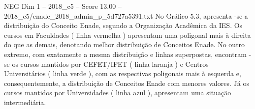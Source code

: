 \begin{textsample}{NEG Dim 1 – 2018\_c5 – Score 13.00 – 2018\_c5/enade\_2018\_admin\_p\_5d727a5391.txt}
No Gráfico 5.3, apresenta -se a distribuição do Conceito Enade, segundo a Organização Acadêmica da IES.
Os cursos em Faculdades ( linha vermelha ) apresentam uma poligonal mais à direita do que as demais, denotando melhor distribuição de Conceitos Enade.
No outro extremo, com exatamente a mesma distribuição e linhas superpostas, encontram -se os cursos mantidos por CEFET/IFET ( linha laranja ) e Centros Universitários ( linha verde ), com as respectivas poligonais mais à esquerda e, consequentemente, a distribuição de Conceitos Enade com menores valores.
Já os cursos mantidos por Universidades ( linha azul ), apresentam uma situação intermediária.

\end{textsample}
